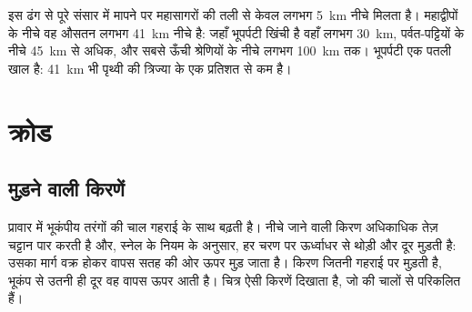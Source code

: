 इस ढंग से पूरे संसार में मापने पर  महासागरों की तली से केवल लगभग
\qty{5}{km} नीचे मिलता है। महाद्वीपों के नीचे वह औसतन लगभग
\qty{41}{km} नीचे है: जहाँ भूपर्पटी खिंची है वहाँ लगभग \qty{30}{km},
पर्वत-पट्टियों के नीचे \qty{45}{km} से अधिक, और सबसे ऊँची श्रेणियों के नीचे लगभग
\qty{100}{km} तक। भूपर्पटी एक पतली खाल है: \qty{41}{km} भी
पृथ्वी की त्रिज्या के एक प्रतिशत से कम है।

\section{क्रोड}

\subsection{मुड़ने वाली किरणें}

प्रावार में भूकंपीय तरंगों की चाल गहराई के साथ बढ़ती है। नीचे जाने वाली
किरण अधिकाधिक तेज़ चट्टान पार करती है और, स्नेल के नियम के अनुसार, हर चरण पर
ऊर्ध्वाधर से थोड़ी और दूर मुड़ती है: उसका मार्ग वक्र होकर वापस
सतह की ओर ऊपर मुड़ जाता है। किरण जितनी गहराई पर मुड़ती है, भूकंप से उतनी ही दूर
वह वापस ऊपर आती है। चित्र ऐसी किरणें दिखाता है, जो
 की चालों से परिकलित हैं।

